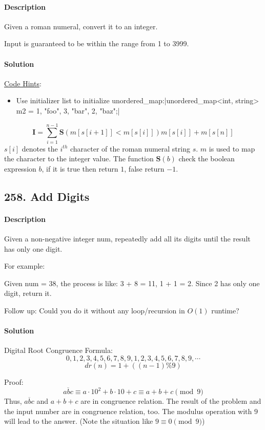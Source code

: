 \paragraph{\color{white} \colorbox{Mahogany}{Description}}
Given a roman numeral, convert it to an integer.

Input is guaranteed to be within the range from 1 to 3999.

\paragraph{\color{white} \colorbox{OliveGreen}{Solution}}
\underline{Code Hints}:
\begin{itemize}
    \item Use initializer list to initialize unordered\_map:|unordered_map<int, string> m2 = {{1, "foo"}, {3, "bar"}, {2, "baz"}};|
\end{itemize}

$$\bm{I}=\sum^{n-1}_{i=1}{\bm{S}(m[s[i+1]]<m[s[i]])m[s[i]]}+m[s[n]]$$
$s[i]$ denotes the $i^{th}$ character of the roman numeral string $s$. $m$ is used to map the character to the integer value. The function $\bm{S}(b)$ check the boolean expression $b$, if it is true then return $1$, false return $-1$. 

\subsection{258. Add Digits}

\paragraph{\color{white} \colorbox{Mahogany}{Description}}
Given a non-negative integer num, repeatedly add all its digits until the result has only one digit.

For example:

Given num = 38, the process is like: 3 + 8 = 11, 1 + 1 = 2. Since 2 has only one digit, return it.

Follow up:
Could you do it without any loop/recursion in $O(1)$ runtime?

\paragraph{\color{white} \colorbox{OliveGreen}{Solution}}
Digital Root Congruence Formula:
$$0, 1, 2, 3, 4, 5, 6, 7, 8, 9, 1, 2, 3, 4, 5, 6, 7, 8, 9,\cdots$$
$$dr(n)=1+((n - 1) \% 9)$$

Proof:
$$\overline{abc}\equiv a\cdot 10^2+b\cdot 10+c\equiv a+b+c \pmod{9}$$
Thus, $\overline{abc}$ and $a+b+c$ are in congruence relation. The result of the problem and the input number are in congruence relation, too. The modulus operation with $9$ will lead to the answer. (Note the situation like $9\equiv 0\pmod{9}$)